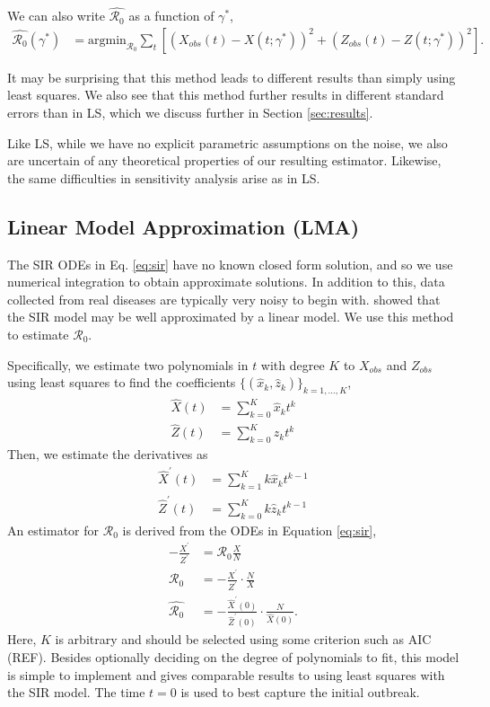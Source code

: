 \documentclass[12pt]{article}
\newcommand{\rr}{\ensuremath{\mathcal{R}_0}}
\begin{document}
We can also write $\hat{\rr}$ as a function of $\gamma^*$,
\begin{align*}
\hat{\rr}(\gamma^*)&= \text{argmin}_{\rr} \sum_{t} \left [ \left (X_{obs}(t) - X(t; \gamma^*)\right )^2 + \left ( Z_{obs}(t) - Z(t; \gamma^*) \right )^2 \right ].
  \end{align*}


It may be surprising that this method leads to different results than simply using least squares.  We also see that this method further results in different standard errors than in LS, which we discuss further in Section \ref{sec:results}.

Like LS, while we have no explicit parametric assumptions on the noise, we also are uncertain of any theoretical properties of our resulting estimator.  Likewise, the same difficulties in sensitivity analysis arise as in LS.



\subsection{Linear Model Approximation (LMA)}\label{linear-model-approximation-degree-10}

The SIR ODEs in Eq. \ref{eq:sir} have no known closed form solution, and so we use numerical integration to obtain approximate solutions.  In addition to this, data collected from real diseases are typically very noisy to begin with.  \cite{chang2017} showed that the SIR model may be well approximated by a linear model.  We use this method to estimate $\rr$.

Specifically, we estimate two polynomials in \(t\) with degree $K$  to \(X_{obs}\)
and \(Z_{obs}\) using least squares to find the coefficients $\{(\hat{x}_k,
\hat{z}_k)\}_{k=1, \dots, K}$,
\begin{align*}
\hat{X}(t) &= \sum_{k=0}^K \hat{x}_k t^k\\
{\hat{Z}}(t) &= \sum_{k=0}^K \hat{z}_k t^k
\end{align*}
Then, we estimate the derivatives as
\begin{align*}
\hat{X}^\prime(t) &= \sum_{k=1}^K k \hat{x}_k t^{k-1}\\
\hat{Z}^\prime(t) &= \sum_{k=0}^K k \hat{z}_k t^{k-1}
\end{align*}
An estimator for $\rr$ is derived from the ODEs in Equation \eqref{eq:sir},
\begin{align}
  - \frac{X^\prime}{Z^\prime}&= \rr \frac{X}{N} \nonumber\\
  \rr &=       -\frac{X^\prime}{
        Z^\prime} \cdot \frac{N}{X} \nonumber\\
  \hat{\rr} &= -\frac{\hat{X}^\prime(0)}{ \hat{Z}^\prime(0)} \cdot \frac{N}{\hat{X}(0)}. \nonumber
  \end{align}
  Here, $K$ is arbitrary and should be selected using some criterion such as AIC (REF).  Besides optionally deciding on the degree of polynomials to fit, this model is simple to implement and gives comparable results to using least squares with the SIR model.  The time $t=0$ is used to best capture the initial outbreak.
\end{document}
